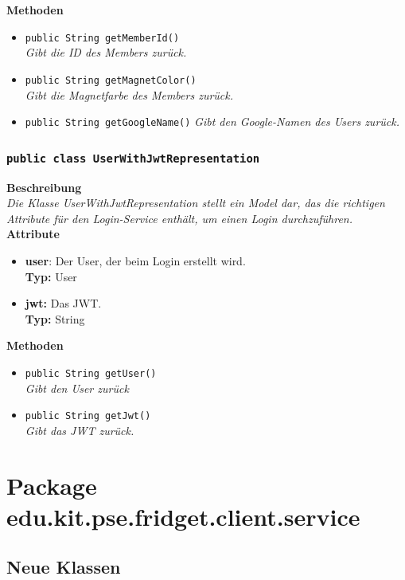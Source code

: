 \documentclass[a4paper]{scrreprt}
\begin{document}
	\textbf{Methoden}
	\begin{itemize}
		\item{\texttt{public String getMemberId()}}\\
		\textit{Gibt die ID des Members zurück.}\\
		\item{\texttt{public String getMagnetColor()}}\\
		\textit{Gibt die Magnetfarbe des Members zurück.}\\
		\item{\texttt{public String getGoogleName()}}
		\textit{Gibt den Google-Namen des Users zurück.}
	\end{itemize}
	\subsubsection{\texttt{public class UserWithJwtRepresentation}}
	\textbf{Beschreibung} \\
	\textit{Die Klasse UserWithJwtRepresentation stellt ein Model dar, das die richtigen Attribute für den Login-Service enthält, um einen Login durchzuführen.} \\
	
	\textbf{Attribute}
	\begin{itemize}
		\item \textbf{user}: Der User, der beim Login erstellt wird. \\
		\textbf{Typ:} User
		
		\item \textbf{jwt:} Das JWT. \\
		\textbf{Typ:} String
	\end{itemize}
	
	\textbf{Methoden}
	\begin{itemize}
		\item{\texttt{public String getUser()}}\\
		\textit{Gibt den User zurück}\\
		\item{\texttt{public String getJwt()}}\\
		\textit{Gibt das JWT zurück.}\\
	\end{itemize}

	\section{Package edu.kit.pse.fridget.client.service}
	\subsection{Neue Klassen}
\end{document}
